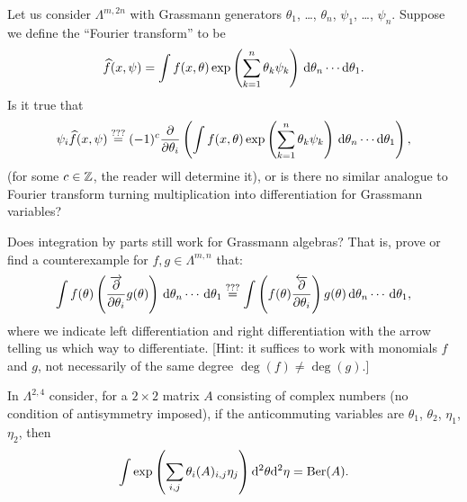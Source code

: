 \begin{exercise}
Let us consider $\Lambda^{m,2n}$ with Grassmann generators $\theta_{1}$,
\dots, $\theta_{n}$, $\psi_{1}$, \dots, $\psi_{n}$. Suppose we define
the ``Fourier transform'' to be
\begin{equation}
\widehat{f}(x,\psi) = \int f(x,\theta)\exp\left(\sum_{k=1}^{n}\theta_{k}\psi_{k}\right)\,\mathrm{d}\theta_{n}\cdots\mathrm{d}\theta_{1}.
\end{equation}
Is it true that
\begin{equation}
\psi_{i}\widehat{f}(x,\psi) \stackrel{???}{=} (-1)^{c} \frac{\partial}{\partial\theta_{i}}\left(\int f(x,\theta)\exp\left(\sum_{k=1}^{n}\theta_{k}\psi_{k}\right)\,\mathrm{d}\theta_{n}\cdots\mathrm{d}\theta_{1}\right),
\end{equation}
(for some $c\in\mathbb{Z}$, the reader will determine it),
or is there no similar analogue to Fourier transform turning
multiplication into differentiation for Grassmann variables?
\end{exercise}

\begin{exercise}
Does integration by parts still work for Grassmann algebras? That is,
prove or find a counterexample for $f,g\in\Lambda^{m,n}$ that:
\begin{equation}
\int f(\theta)\left(\frac{\overrightarrow{\partial}}{\partial\theta_{i}}g(\theta)\right)\,\mathrm{d}\theta_{n}\cdots\,\mathrm{d}\theta_{1}
\stackrel{???}{=}
\int \left(f(\theta)\frac{\overleftarrow{\partial}}{\partial\theta_{i}}\right)g(\theta)\,\mathrm{d}\theta_{n}\cdots\,\mathrm{d}\theta_{1},
\end{equation}
where we indicate left differentiation and right differentiation with
the arrow telling us which way to differentiate. [Hint: it suffices to
  work with monomials $f$ and $g$, not necessarily of the same degree $\deg(f)\neq\deg(g)$.]
\end{exercise}

\begin{exercise}
In $\Lambda^{2,4}$ consider, for a $2\times 2$ matrix $A$ consisting of
complex numbers (no condition of antisymmetry imposed), if the
anticommuting variables are $\theta_{1}$, $\theta_{2}$, $\eta_{1}$, $\eta_{2}$,
then
\begin{equation}
\int\exp\left(\sum_{i,j}\theta_{i}(A)_{i,j}\eta_{j}\right)\mathrm{d}^{2}\theta\mathrm{d}^{2}\eta=\operatorname{Ber}(A).
\end{equation}
\end{exercise}

